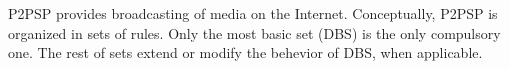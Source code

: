 P2PSP provides broadcasting of media on the Internet.  Conceptually,
P2PSP is organized in sets of rules. Only the most basic set (DBS) is
the only compulsory one. The rest of sets extend or modify the
behevior of DBS, when applicable.

